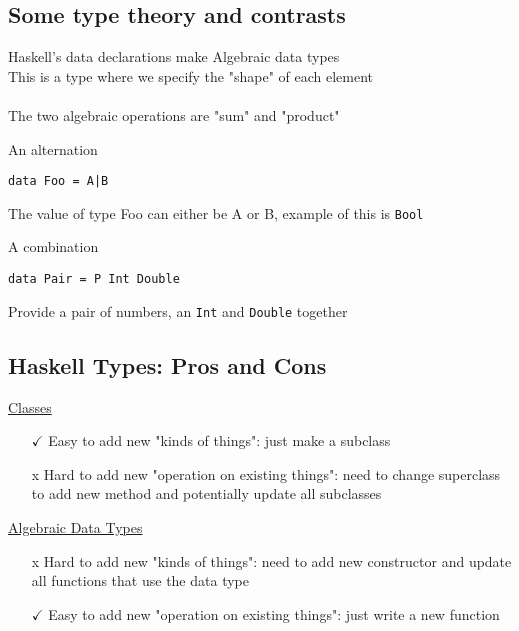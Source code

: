 \documentclass{article}[18pt]
\begin{document}
\subsection{Some type theory and contrasts}
Haskell's data declarations make Algebraic data types\\
This is a type where we specify the "shape" of each element\\
\\
The two algebraic operations are "sum" and "product"
\begin{defin}
An alternation
\begin{verbatim}
data Foo = A|B
\end{verbatim}
The value of type Foo can either be A or B, example of this is \texttt{Bool}
\end{defin}

\begin{defin}
A combination
	\begin{verbatim}
data Pair = P Int Double
	\end{verbatim}
Provide a pair of numbers, an \texttt{Int} and \texttt{Double} together
\end{defin}
\subsection{Haskell Types: Pros and Cons}
\begin{minipage}{0.5\textwidth}
\begin{center}
\underline{Classes}
\end{center}
\begin{itemize}
	\item [$\checkmark$] Easy to add new "kinds of things": just make a subclass
	\item [x] Hard to add new "operation on existing things": need to change superclass to add new method and potentially update all subclasses
\end{itemize}
\end{minipage}
\begin{minipage}{0.5\textwidth}
\begin{center}
	\underline{Algebraic Data Types}
\end{center}
	\begin{itemize}
		\item [x] Hard to add new "kinds of things": need to add new constructor and update all functions that use the data type
		\item [$\checkmark$] Easy to add new "operation on existing things": just write a new function
	\end{itemize}
\end{minipage}
\end{document}
